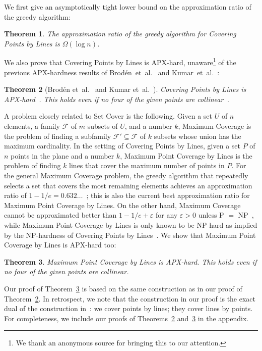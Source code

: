 \documentclass[letterpaper,11pt]{article}
\newtheorem{theorem}{Theorem}
\def\etal{{et~al.}}
\def\F{{\mathcal F}}
\newcommand{\eps}{\varepsilon}
\begin{document}
We first give an asymptotically tight lower bound
on the approximation ratio of the greedy algorithm:

\begin{theorem}\label{thm:greedy}
The approximation ratio of the greedy algorithm for {\sc Covering Points by Lines} is
$\Omega(\log n)$.
\end{theorem}

We also prove that {\sc Covering Points by Lines} is APX-hard, unaware\footnote{We
  thank an anonymous source for bringing this to our attention.} of
the previous APX-hardness results of Brod\'en~\etal~\cite{BHN01} and
Kumar~\etal~\cite{KAR00}:
\begin{theorem}[Brod\'en \etal~\cite{BHN01} and Kumar \etal~\cite{KAR00}]
\label{thm:min}
{\sc Covering Points by Lines} is APX-hard~\textup{\cite{BHN01,KAR00}}.
This holds even if no four of the given points are collinear~\textup{\cite{BHN01}}.
\end{theorem}

A problem closely related to {\sc Set Cover} is the following.
Given a set $U$ of $n$ elements, a family $\F$ of $m$ subsets of $U$,
and a number $k$,
{\sc Maximum Coverage} is the problem of finding a subfamily $\F' \subseteq \F$
of $k$ subsets whose union has the maximum cardinality.
In the setting of {\sc Covering Points by Lines},
given a set $P$ of $n$ points in the plane and a number $k$,
{\sc Maximum Point Coverage by Lines}
is the problem of finding $k$ lines
that cover the maximum number of points in $P$.
For the general {\sc Maximum Coverage} problem,
the greedy algorithm that repeatedly selects a set that covers the most
remaining elements achieves an approximation ratio of
$1 - 1/e = 0.632\ldots$~\cite[Section~3.9]{Ho97};
this is also the current best approximation ratio for 
{\sc Maximum Point Coverage by Lines}. 
On the other hand, {\sc Maximum Coverage} cannot be approximated better than
$1 - 1/e + \eps$ for any $\eps > 0$ unless P $=$ NP~\cite{Fe98},
while {\sc Maximum Point Coverage by Lines} is only known to be NP-hard as implied by
the NP-hardness of {\sc Covering Points by Lines}~\cite{MT82}.
We show that {\sc Maximum Point Coverage by Lines} is APX-hard too:

\begin{theorem}\label{thm:max}
{\sc Maximum Point Coverage by Lines} is APX-hard.
This holds even if no four of the given points are collinear.
\end{theorem}

Our proof of Theorem~\ref{thm:max} is based on the same construction
as in our proof of Theorem~\ref{thm:min}.
In retrospect, we note that
the construction in our proof is the exact dual of the construction
in~\cite{BHN01}: we cover points by lines; they cover lines by points.
For completeness, we include our proofs of Theorems~\ref{thm:min} and~\ref{thm:max}
in the appendix.
\end{document}
